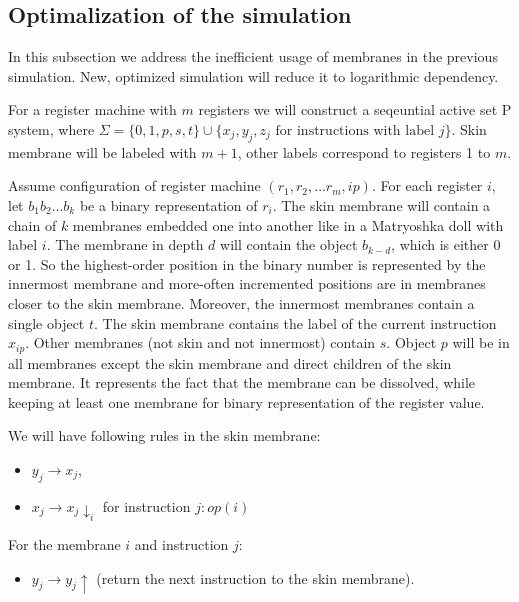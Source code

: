 \documentclass[llncs,submission,copyright,creativecommons]{../lib/lncs/llncs}
\begin{document}

\subsection{Optimalization of the simulation} %
\label{sub:optimalization_of_the_simulation}

In this subsection we address the inefficient usage of membranes in the previous simulation. New, optimized simulation will reduce it to logarithmic dependency.

For a register machine with $m$ registers we will construct a seqeuntial active set P system, where $\Sigma = \{0,1,p,s,t\}\cup\{x_j, y_j, z_j \text{~for instructions with label~} j\}$. Skin membrane will be labeled with $m+1$, other labels correspond to registers 1 to $m$.

Assume configuration of register machine $(r_1, r_2, \ldots r_m, ip)$. For each register $i$, let $b_1b_2\ldots b_k$ be a binary representation of $r_i$. The skin membrane will contain a chain of $k$ membranes embedded one into another like in a Matryoshka doll with label $i$.
The membrane in depth $d$ will contain the object $b_{k-d}$, which is either 0 or 1. So the highest-order position in the binary number is represented by the innermost membrane and more-often incremented positions are in membranes closer to the skin membrane. Moreover, the innermost membranes contain a single object $t$. The skin membrane contains the label of the current instruction $x_{ip}$. Other membranes (not skin and not innermost) contain $s$. Object $p$ will be in all membranes except the skin membrane and direct children of the skin membrane. It represents the fact that the membrane can be dissolved, while keeping at least one membrane for binary representation of the register value.


We will have following rules in the skin membrane:
\begin{itemize}
  \item $y_j \rightarrow x_j$,
  \item $x_j \rightarrow x_j\downarrow_{i}$ for instruction $j: op(i)$
\end{itemize}

For the membrane $i$ and instruction $j$:
\begin{itemize}
  \item $y_j \rightarrow y_j \uparrow$ (return the next instruction to the skin membrane).
\end{itemize}
\end{document}
